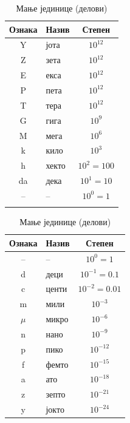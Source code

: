 \documentclass[10pt]{article}
\begin{document}
\begin{table}[htbp]
  \centering
  \begin{minipage}[t]{0.40\textwidth}
    \centering
    \caption{Веће јединице (умношци)}
    \begin{tabular}{|c|l|c|}
      \hline
      \textbf{Ознака} & \textbf{Назив} & \textbf{Степен} \\ \hline
      Y & јота & $10^{12}$    \\ \hline
      Z & зета & $10^{12}$    \\ \hline
      E & екса & $10^{12}$    \\ \hline
      P & пета & $10^{12}$    \\ \hline
      T  & тера & $10^{12}$    \\ \hline
      G  & гига & $10^{9}$     \\ \hline
      M  & мега & $10^{6}$     \\ \hline
      k  & кило & $10^{3}$     \\ \hline
      h   & хекто & $10^{2} = 100$     \\ \hline
      da & дека & $10^{1} = 10$     \\ \hline
      -- & --   & $10^{0} = 1$ \\ \hline
      \multicolumn{3}{c}{} \\ %
    \end{tabular}
  \end{minipage}
 \hspace{0.01cm}
  \begin{minipage}[t]{0.40\textwidth}
    \centering
    \caption{Мање јединице (делови)}
    \begin{tabular}{|c|l|c|}
      \hline
      \textbf{Ознака} & \textbf{Назив} & \textbf{Степен} \\ \hline
      --    & --    & $10^{0} = 1$ \\ \hline
      d     & деци  & $10^{-1} = 0.1$    \\ \hline
      c     & центи & $10^{-2} = 0.01$    \\ \hline
      m     & мили  & $10^{-3}$    \\ \hline
      $\mu$ & микро & $10^{-6}$    \\ \hline
      n     & нано  & $10^{-9}$    \\ \hline
      p     & пико  & $10^{-12}$   \\ \hline
      f     & фемто & $10^{-15}$   \\ \hline
      a     & ато   & $10^{-18}$    \\ \hline
      z     & зепто & $10^{-21}$    \\ \hline
      y     & јокто & $10^{-24}$    \\ \hline
    \end{tabular}
  \end{minipage}
\end{table}
\end{document}
